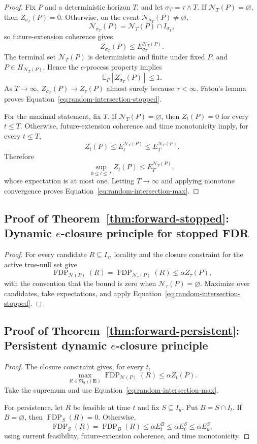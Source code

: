 \documentclass[11pt]{article}
\numberwithin{equation}{section}
\theoremstyle{plain}
\theoremstyle{definition}
\newcommand{\E}{\mathbb E}
\newcommand{\Rfam}{\mathfrak R}
\newcommand{\FDP}{\operatorname{FDP}}
\newcommand{\calN}{\mathcal N}
\begin{document}
\begin{proof}
Fix $P$ and a deterministic horizon $T$, and let $\sigma_T=\tau\wedge T$. If $\calN_T(P)=\varnothing$, then $Z_{\sigma_T}(P)=0$. Otherwise, on the event $\calN_{\sigma_T}(P)\neq\varnothing$,
\[
  \calN_{\sigma_T}(P)=\calN_T(P)\cap I_{\sigma_T},
\]
so future-extension coherence gives
\[
  Z_{\sigma_T}(P)\leq E_{\sigma_T}^{\calN_T(P)}.
\]
The terminal set $\calN_T(P)$ is deterministic and finite under fixed $P$, and $P\in H_{\calN_T(P)}$. Hence the $e$-process property implies
\[
  \E_P[Z_{\sigma_T}(P)]\leq1.
\]
As $T\to\infty$, $Z_{\sigma_T}(P)\to Z_\tau(P)$ almost surely because $\tau<\infty$. Fatou's lemma proves Equation~\eqref{eq:random-intersection-stopped}.

For the maximal statement, fix $T$. If $\calN_T(P)=\varnothing$, then $Z_t(P)=0$ for every $t\leq T$. Otherwise, future-extension coherence and time monotonicity imply, for every $t\leq T$,
\[
  Z_t(P)\leq E_t^{\calN_T(P)}\leq E_T^{\calN_T(P)}.
\]
Therefore
\[
  \sup_{0\leq t\leq T}Z_t(P)\leq E_T^{\calN_T(P)},
\]
whose expectation is at most one. Letting $T\to\infty$ and applying monotone convergence proves Equation~\eqref{eq:random-intersection-max}.
\end{proof}

\subsection{Proof of Theorem~\ref{thm:forward-stopped}: Dynamic \texorpdfstring{$e$}{e}-closure principle for stopped FDR}\label{app:proof-forward-stopped}

\begin{proof}
For every candidate $R\subseteq I_\tau$, locality and the closure constraint for the active true-null set give
\[
  \FDP_{\calN(P)}(R)=\FDP_{\calN_\tau(P)}(R)
  \leq \alpha Z_\tau(P),
\]
with the convention that the bound is zero when $\calN_\tau(P)=\varnothing$. Maximize over candidates, take expectations, and apply Equation~\eqref{eq:random-intersection-stopped}.
\end{proof}

\subsection{Proof of Theorem~\ref{thm:forward-persistent}: Persistent dynamic \texorpdfstring{$e$}{e}-closure principle}\label{app:proof-forward-persistent}

\begin{proof}
The closure constraint gives, for every $t$,
\[
  \max_{R\in\Rfam_{\alpha,t}(\mathbf E)}\FDP_{\calN(P)}(R)
  \leq\alpha Z_t(P).
\]
Take the supremum and use Equation~\eqref{eq:random-intersection-max}.

For persistence, let $R$ be feasible at time $t$ and fix $S\subseteq I_u$. Put $B=S\cap I_t$. If $B=\varnothing$, then $\FDP_S(R)=0$. Otherwise,
\[
  \FDP_S(R)=\FDP_B(R)
  \leq\alpha E_t^B
  \leq\alpha E_t^S
  \leq\alpha E_u^S,
\]
using current feasibility, future-extension coherence, and time monotonicity.
\end{proof}
\end{document}
